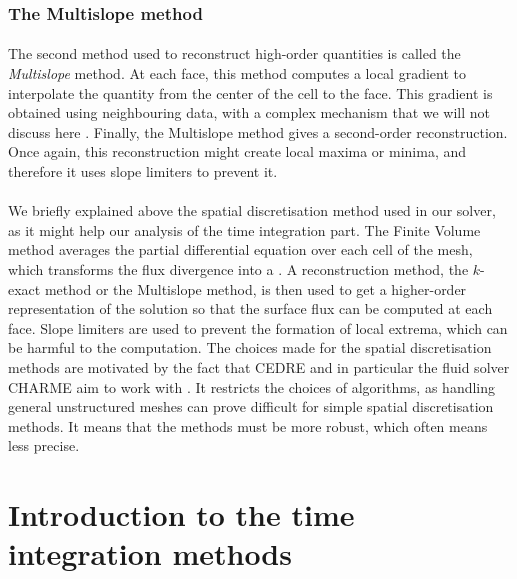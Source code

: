       \subsubsection{The Multislope method}

        \paragraph{}
        The second method used to reconstruct high-order quantities is called the \emph{Multislope} method.
        At each face, this method computes a local gradient to interpolate the quantity from the center of the cell to the face.
        This gradient is obtained using neighbouring data, with a complex mechanism that we will not discuss here \cite{LeTouzeMurroneGuillard2015}.
        Finally, the Multislope method gives a second-order reconstruction.
        Once again, this reconstruction might create local maxima or minima, and therefore it uses slope limiters \cite{Venkatakrishnan1993, BergerAftosmis2005} to prevent it.


      \paragraph{}
      We briefly explained above the spatial discretisation method used in our solver, as it might help our analysis of the time integration part.
      The Finite Volume method averages the partial differential equation over each cell of the mesh, which transforms the flux divergence into a .
      A reconstruction method, the $k$-exact method or the Multislope method, is then used to get a higher-order representation of the solution so that the surface flux can be computed at each face.
      Slope limiters are used to prevent the formation of local extrema, which can be harmful to the computation.
      The choices made for the spatial discretisation methods are motivated by the fact that CEDRE and in particular the fluid solver CHARME aim to work with .
      It restricts the choices of algorithms, as handling general unstructured meshes can prove difficult for simple spatial discretisation methods.
      It means that the methods must be more robust, which often means less precise.


  \section{Introduction to the time integration methods}

